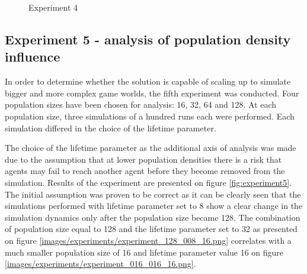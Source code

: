 \begin{figure}[H]
    \centering
    \hspace*{\fill}
    \hspace*{\fill}

    \caption{Experiment 4} \label{fig:experiment3}
\end{figure}

\subsection{Experiment 5 - analysis of population density influence}

In order to determine whether the solution is capable of scaling up to simulate bigger and more complex game worlds, the fifth experiment was conducted.
Four population sizes have been chosen for analysis: 16, 32, 64 and 128.
At each population size, three simulations of a hundred runs each were performed.
Each simulation differed in the choice of the lifetime parameter.

The choice of the lifetime parameter as the additional axis of analysis was made due to the assumption that at lower population densities there is a risk that agents may fail to reach another agent before they become removed from the simulation.
Results of the experiment are presented on figure \ref{fig:experiment5}.
The initial assumption was proven to be correct as it can be clearly seen that the simulations performed with lifetime parameter set to 8 show a clear change in the simulation dynamics only after the population size became 128.
The combination of population size equal to 128 and the lifetime parameter set to 32 as presented on figure \ref{images/experiments/experiment_128_008_16.png} correlates with a much smaller population size of 16 and lifetime parameter value 16 on figure \ref{images/experiments/experiment_016_016_16.png}.

